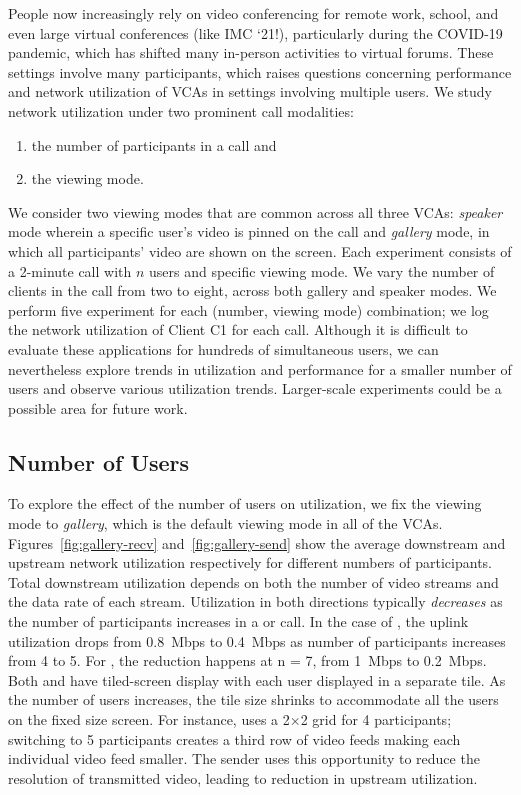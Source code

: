 People now increasingly rely on video conferencing for remote work,
school, and even large virtual conferences (like IMC `21!),
particularly during the COVID-19 pandemic, which has shifted many in-person
activities to virtual forums. These settings involve many
participants, which raises questions concerning performance and network
utilization of VCAs in settings involving multiple users.
We study network utilization under two prominent call modalities: 
\begin{enumerate}
    \itemsep=-1pt
    \item the
    number of participants in a call and 
\item the viewing mode.
\end{enumerate}
\noindent
We consider two
viewing modes that are common across all three VCAs: \textit{speaker} mode
wherein a specific user's video is pinned on the call and \textit{gallery}
mode, in which all participants' video are shown on the screen.  Each
experiment consists of a 2-minute call with $n$ users and specific viewing
mode. We vary the number of clients in the call from two to eight, across both
gallery and speaker modes.
We perform five experiment for each (number, viewing mode) combination; we log the
network utilization of Client C1 for each call.  Although it is
difficult to evaluate these applications for hundreds of simultaneous users,
we can nevertheless explore trends in utilization and performance for a
smaller number of users and observe various utilization trends. Larger-scale
experiments could be a possible area for future work.


\subsection{Number of Users}

To explore the effect of the number of users on utilization, we fix the
viewing mode to \textit{gallery}, which is the default viewing mode in all of
the VCAs. Figures~\ref{fig:gallery-recv} and~\ref{fig:gallery-send} show the
average downstream and upstream network utilization respectively for different
numbers of participants.  Total downstream utilization depends on both the
number of video streams and the data rate of each stream.  Utilization in both
directions typically {\em decreases} as the number of participants increases
in a \meet or \zoom call. In the case of \zoom, the uplink utilization drops
from 0.8~Mbps to 0.4~Mbps as number of participants increases from 4 to 5. For \meet, the reduction happens at n = 7, from
1~Mbps to 0.2~Mbps.  Both \meet and \zoom have tiled-screen display with each
user displayed in a separate tile.  As the number of users increases, the tile
size shrinks to accommodate all the users on the fixed size screen. For instance, \zoom uses a 2$\times$2 grid for 4 participants; switching to 5 participants creates a third row of video feeds making each individual video feed smaller.  The
sender uses this opportunity to reduce the resolution of transmitted video,
leading to reduction in upstream utilization.

